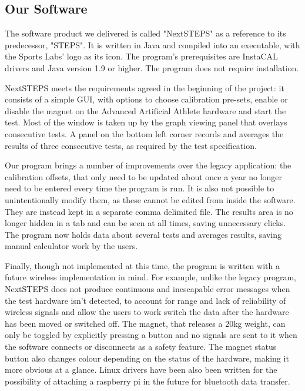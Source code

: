 \documentclass{l3proj}
\begin{document}
\subsection{Our Software}
The software product we delivered is called "NextSTEPS" as a reference to its predecessor, "STEPS". It is written in Java and compiled into an executable, with the Sports Labs' logo as its icon. The program's prerequisites are InstaCAL drivers and Java version 1.9 or higher. The program does not require installation.

NextSTEPS meets the requirements agreed in the beginning of the project: it consists of a simple GUI, with options to choose calibration pre-sets, enable or disable the magnet on the Advanced Artificial Athlete hardware and start the test. Most of the window is taken up by the graph viewing panel that overlays consecutive tests. A panel on the bottom left corner records and averages the results of three consecutive tests, as required by the test specification\cite{fifa}.

Our program brings a number of improvements over the legacy application: the calibration offsets, that only need to be updated about once a year no longer need to be entered every time the program is run. It is also not possible to unintentionally modify them, as these cannot be edited from inside the software. They are instead kept in a separate comma delimited file. The results area is no longer hidden in a tab and can be seen at all times, saving unnecessary clicks. The program now holds data about several tests and averages results, saving manual calculator work by the users.

Finally, though not implemented at this time, the program is written with a future wireless implementation in mind. For example, unlike the legacy program, NextSTEPS does not produce continuous and inescapable error messages when the test hardware isn't detected, to account for range and lack of reliability of wireless signals and allow the users to work switch the data after the hardware has been moved or switched off. The magnet, that releases a 20kg weight, can only be toggled by explicitly pressing a button and no signals are sent to it when the software connects or disconnects as a safety feature. The magnet status button also changes colour depending on the status of the hardware, making it more obvious at a glance. Linux drivers have been also been written for the possibility of attaching a raspberry pi in the future for bluetooth data transfer. 
\end{document}
